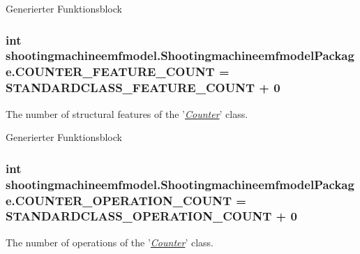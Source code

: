 Generierter Funktionsblock  \hypertarget{interfaceshootingmachineemfmodel_1_1_shootingmachineemfmodel_package_ad6208c374c154f320a71b15e424089ff}{
\subsubsection[{C\-O\-U\-N\-T\-E\-R\-\_\-\-F\-E\-A\-T\-U\-R\-E\-\_\-\-C\-O\-U\-N\-T}]{\setlength{\rightskip}{0pt plus 5cm}int shootingmachineemfmodel.\-Shootingmachineemfmodel\-Package.\-C\-O\-U\-N\-T\-E\-R\-\_\-\-F\-E\-A\-T\-U\-R\-E\-\_\-\-C\-O\-U\-N\-T = {\bf S\-T\-A\-N\-D\-A\-R\-D\-C\-L\-A\-S\-S\-\_\-\-F\-E\-A\-T\-U\-R\-E\-\_\-\-C\-O\-U\-N\-T} + 0}}\label{interfaceshootingmachineemfmodel_1_1_shootingmachineemfmodel_package_ad6208c374c154f320a71b15e424089ff}
The number of structural features of the '{\itshape \hyperlink{interfaceshootingmachineemfmodel_1_1_counter}{Counter}}' class.

Generierter Funktionsblock  \hypertarget{interfaceshootingmachineemfmodel_1_1_shootingmachineemfmodel_package_ac8ea781de85388207a4af140694d93c0}{
\subsubsection[{C\-O\-U\-N\-T\-E\-R\-\_\-\-O\-P\-E\-R\-A\-T\-I\-O\-N\-\_\-\-C\-O\-U\-N\-T}]{\setlength{\rightskip}{0pt plus 5cm}int shootingmachineemfmodel.\-Shootingmachineemfmodel\-Package.\-C\-O\-U\-N\-T\-E\-R\-\_\-\-O\-P\-E\-R\-A\-T\-I\-O\-N\-\_\-\-C\-O\-U\-N\-T = {\bf S\-T\-A\-N\-D\-A\-R\-D\-C\-L\-A\-S\-S\-\_\-\-O\-P\-E\-R\-A\-T\-I\-O\-N\-\_\-\-C\-O\-U\-N\-T} + 0}}\label{interfaceshootingmachineemfmodel_1_1_shootingmachineemfmodel_package_ac8ea781de85388207a4af140694d93c0}
The number of operations of the '{\itshape \hyperlink{interfaceshootingmachineemfmodel_1_1_counter}{Counter}}' class.

